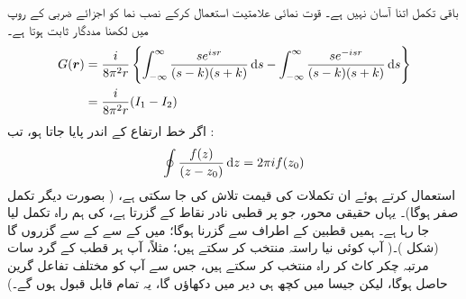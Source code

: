 باقی تکمل اتنا آسان نہیں ہے۔ قوت نمائی علامتیت استعمال کرکے نصب نما کو اجزائے ضربی کے روپ میں لکھنا مددگار ثابت ہوتا ہے۔
\begin{align}\label{مساوات_بکھراو_گرین_دوبارہ}
	G(\kvec{r}) &= \frac{i}{8\pi^2r}\left\{\int_{-\infty}^{\infty}\frac{se^{isr}}{(s-k)(s+k)}\dif s-\int_{-\infty}^{\infty}\frac{se^{-isr}}{(s-k)(s+k)}\dif s\right\}\nonumber \\
	&= \frac{i}{8\pi^2r}(I_1-I_2)
\end{align}
اگر  خط ارتفاع کے اندر پایا جاتا ہو، تب : 
\begin{align}
	\oint\frac{f(z)}{(z-z_0)}\dif z = 2\pi if(z_0)
\end{align}
استعمال کرتے ہوئے ان تکملات کی قیمت تلاش کی جا سکتی ہے، ( بصورت دیگر تکمل صفر ہوگا)۔ یہاں حقیقی محور، جو  پر قطبی نادر نقاط کے  گزرتا ہے، کی ہم راہ تکمل لیا جا رہا ہے۔ ہمیں قطبین کے اطراف سے گزرنا ہوگا؛ میں  کے  سے  کے  سے گزروں گا (شکل )۔( آپ کوئی نیا راستہ منتخب کر سکتے ہیں؛ مثلاً، آپ ہر قطب کے گرد سات مرتبہ چکر کاٹ کر راہ منتخب کر سکتے ہیں، جس سے آپ کو مختلف تفاعل گرین حاصل ہوگا، لیکن جیسا میں کچھ ہی دیر میں دکھاؤں گا، یہ تمام قابل قبول ہوں گے۔)


